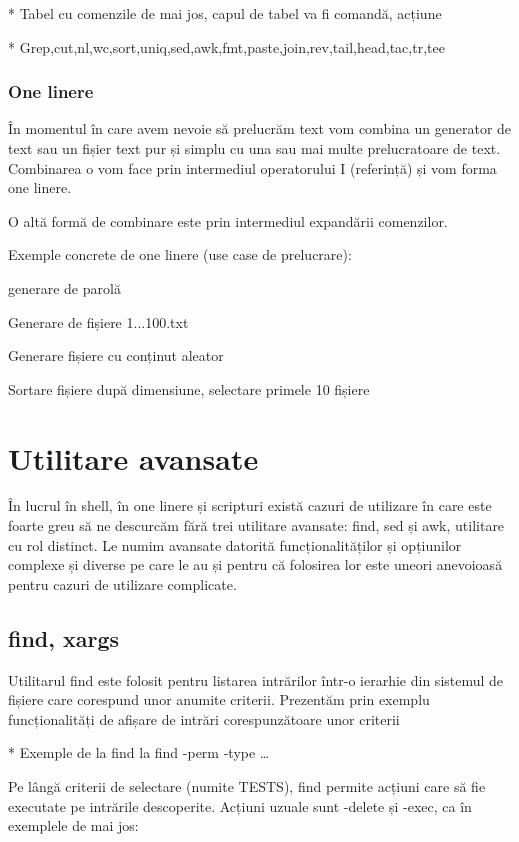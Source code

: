 * Tabel cu comenzile de mai jos, capul de tabel va fi comandă, acțiune

* Grep,cut,nl,wc,sort,uniq,sed,awk,fmt,paste,join,rev,tail,head,tac,tr,tee

\subsubsection{One linere}
\label{sec:cli-one-liners}

În momentul în care avem nevoie să prelucrăm text vom combina un generator de
text sau un fișier text pur și simplu cu una sau mai multe prelucratoare de
text. Combinarea o vom face prin intermediul operatorului I (referință) și vom
forma one linere.

O altă formă de combinare este prin intermediul expandării comenzilor.

Exemple concrete de one linere (use case de prelucrare):

generare de parolă

Generare de fișiere 1...100.txt

Generare fișiere cu conținut aleator

Sortare fișiere după dimensiune, selectare primele 10 fișiere

\section{Utilitare avansate}
\label{sec:cli-advanced-utils}

În lucrul în shell, în one linere și scripturi există cazuri de utilizare în
care este foarte greu să ne descurcăm fără trei utilitare avansate: find, sed și
awk, utilitare cu rol distinct. Le numim avansate datorită funcționalităților și
opțiunilor complexe și diverse pe care le au și pentru că folosirea lor este
uneori anevoioasă pentru cazuri de utilizare complicate.

\subsection{find, xargs}
\label{sec:cli-find-xargs}

Utilitarul find este folosit pentru listarea intrărilor într-o ierarhie din
sistemul de fișiere care corespund unor anumite criterii. Prezentăm prin exemplu
funcționalități de afișare de intrări corespunzătoare unor criterii

* Exemple de la find la find -perm -type …

Pe lângă criterii de selectare (numite TESTS), find permite acțiuni care să fie
executate pe intrările descoperite. Acțiuni uzuale sunt -delete și -exec, ca în
exemplele de mai jos:

